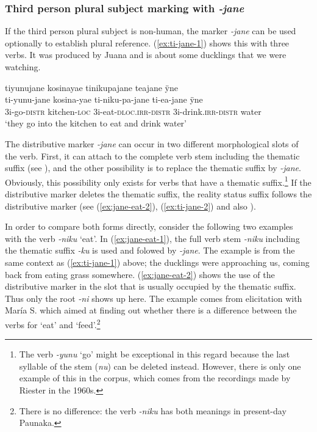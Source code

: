 \subsubsection{Third person plural subject marking with \textit{-jane}} If the third person plural subject is non-human, the marker \textit{-jane} can be used optionally to establish plural reference. (\ref{ex:ti-jane-1}) shows this with three verbs. It was produced by Juana and is about some ducklings that we were watching.
 
 \ea\label{ex:ti-jane-1}
\begingl 
\glpreamble tiyunujane kosinayae tinikupajane teajane ÿne\\
\gla ti-yunu-jane kosina-yae ti-niku-pa-jane ti-ea-jane ÿne\\ 
\glb 3i-go-\textsc{distr} kitchen-\textsc{loc} 3i-eat-\textsc{dloc.irr}-\textsc{distr} 3i-drink.\textsc{irr}-\textsc{distr} water\\ 
\glft ‘they go into the kitchen to eat and drink water’
\trailingcitation{[jxx-e150925l-1.116]}
\xe

The distributive marker \textit{-jane} can occur in two different morphological slots of the verb. First, it can attach to the complete verb stem including the thematic suffix  (see ), and the other possibility is to replace the thematic suffix by \textit{-jane}. Obviously, this possibility only exists for verbs that have a thematic suffix.\footnote{The verb \textit{-yunu} ‘go’ might be exceptional in this regard because the last syllable of the stem (\textit{nu}) can be deleted instead. However, there is only one example of this in the corpus, which comes from the recordings made by Riester in the 1960s.} If the distributive marker deletes the thematic suffix, the reality status suffix follows the distributive marker (see (\ref{ex:jane-eat-2}), (\ref{ex:ti-jane-2}) and also ).

In order to compare both forms directly, consider the following two examples with the verb \textit{-niku} ‘eat’. In (\ref{ex:jane-eat-1}), the full verb stem \textit{-niku} including the thematic suffix \textit{-ku} is used and folowed by \textit{-jane}. The example is from the same context as (\ref{ex:ti-jane-1}) above; the ducklings were approaching us, coming back from eating grass somewhere. (\ref{ex:jane-eat-2}) shows the use of the distributive marker in the slot that is usually occupied by the thematic suffix. Thus only the root \textit{-ni} shows up here. The example comes from elicitation with María S. which aimed at finding out whether there is a difference between the verbs for ‘eat’ and ‘feed’.\footnote{There is no difference: the verb \textit{-niku} has both meanings in present-day Paunaka.}

